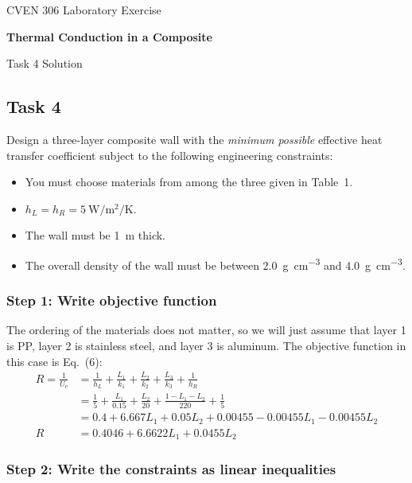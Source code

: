 \documentclass{article}
\begin{document}
\allsectionsfont{\normalfont\sffamily\bfseries}
\begin{center}
    \large{CVEN 306 Laboratory Exercise}

    \Large{\textsf{\textbf{Thermal Conduction in a Composite}}}

    \large{\textsf{Task 4 Solution}}
\end{center}

\vspace{0.25truein}
\subsection*{Task 4}
Design a three-layer composite wall with the \textit{minimum possible} effective heat transfer coefficient
subject to the following engineering constraints:
\begin{itemize}
    \item You must choose materials from among the three given in Table~1.
    \item $h_L = h_R = \SI{5}{\watt\per\meter\squared\per\kelvin}$.
    \item The wall must be \SI{1}{\meter} thick.
    \item The overall density of the wall must be between
        \SI{2.0}{\gram\per\centi\meter\cubed} and
        \SI{4.0}{\gram\per\centi\meter\cubed}.
\end{itemize}

\subsubsection*{Step 1: Write objective function}
The ordering of the materials does not matter, so we will just assume that layer 1
is PP, layer 2 is stainless steel, and layer 3 is aluminum.
The objective function in this case is Eq.~(6):
\begin{align}
    R = \frac{1}{U_{\text{e}}} &= \frac{1}{h_L} + \frac{L_1}{k_1} + \frac{L_2}{k_2}
    + \frac{L_3}{k_3} + \frac{1}{h_R} \nonumber \\
    &= \frac{1}{5} + \frac{L_1}{0.15} + \frac{L_2}{20} + \frac{1 - L_1 - L_2}{220} + \frac{1}{5}
    \nonumber \\
    &= 0.4 + 6.667 L_1 + 0.05 L_2 + 0.00455 - 0.00455 L_1 - 0.00455 L_2 \nonumber \\
    R &= 0.4046 + 6.6622 L_1 + 0.0455 L_2
    \label{eq:objectivefn}
\end{align}

\subsubsection*{Step 2: Write the constraints as linear inequalities}
\end{document}
